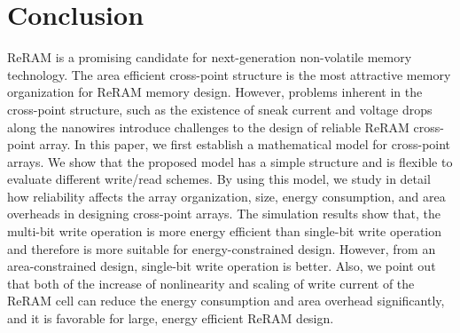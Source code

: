 
\section{Conclusion}\label{sec:conclusion}
\vspace{10pt} ReRAM is a promising candidate for next-generation
non-volatile memory technology. The area efficient cross-point structure
is the most attractive memory organization for ReRAM memory design.
However, problems inherent in the cross-point structure, such as the
existence of sneak current and voltage drops along the nanowires introduce
challenges to the design of reliable ReRAM cross-point array. In this
paper, we first establish a mathematical model for cross-point arrays. We
show that the proposed model has a simple structure and is flexible to
evaluate different write/read schemes. By using this model, we study in
detail how reliability affects the array organization, size, energy
consumption, and area overheads in designing cross-point arrays. The
simulation results show that, the multi-bit write operation is more energy
efficient than single-bit write operation and therefore is more suitable
for energy-constrained design. However, from an area-constrained design,
single-bit write operation is better. Also, we point out that both of the
increase of nonlinearity and scaling of write current of the ReRAM cell
can reduce the energy consumption and area overhead significantly, and it
is favorable for large, energy efficient ReRAM design.
